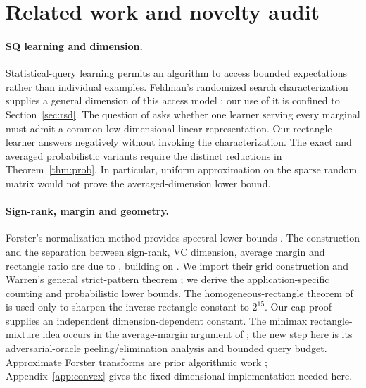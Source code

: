 \documentclass[11pt]{article}
\newcommand{\1}{\mathbf 1}
\begin{document}


\section{Related work and novelty audit}\label{sec:related}
\paragraph{SQ learning and dimension.}
Statistical-query learning permits an algorithm to access bounded expectations rather than individual examples. Feldman's randomized search characterization supplies a general dimension of this access model \citep{Feldman17}; our use of it is confined to Section~\ref{sec:rsd}. The question of \citet{FKS26} asks whether one learner serving every marginal must admit a common low-dimensional linear representation. Our rectangle learner answers negatively without invoking the characterization. The exact and averaged probabilistic variants require the distinct reductions in Theorem~\ref{thm:prob}. In particular, uniform approximation on the sparse random matrix would not prove the averaged-dimension lower bound.

\paragraph{Sign-rank, margin and geometry.}
Forster's normalization method provides spectral lower bounds \citep{Forster02}. The construction and the separation between sign-rank, VC dimension, average margin and rectangle ratio are due to \citet{HHPTZ22}, building on \citet{AMY16}. We import their grid construction and Warren's general strict-pattern theorem \citep{Warren68}; we derive the application-specific counting and probabilistic lower bounds. The homogeneous-rectangle theorem of \citet{APP05} is used only to sharpen the inverse rectangle constant to $2^{15}$. Our cap proof supplies an independent dimension-dependent constant. The minimax rectangle-mixture idea occurs in the average-margin argument of \citet[Theorem~3.1]{HHPTZ22}; the new step here is its adversarial-oracle peeling/elimination analysis and bounded query budget. Approximate Forster transforms are prior algorithmic work \citep{DKT22}; Appendix~\ref{app:convex} gives the fixed-dimensional implementation needed here.
\end{document}
